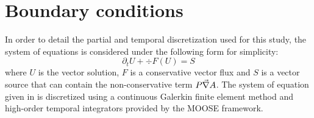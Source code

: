 \section{Boundary conditions} \label{sec:bc}
In order to detail the partial and temporal discretization used for this study, the system of equations  is considered under the following form for simplicity:
\begin{equation}
\label{eq:form_sct3}
\partial_t U + \div F\left( U \right) = S
\end{equation}
where $U$ is the vector solution, $F$ is a conservative vector flux and $S$ is a vector source that can contain the non-conservative term $P\vec{\nabla} A$.
The system of equation given in  is discretized using a continuous Galerkin finite element method and high-order temporal integrators provided by the MOOSE framework.
